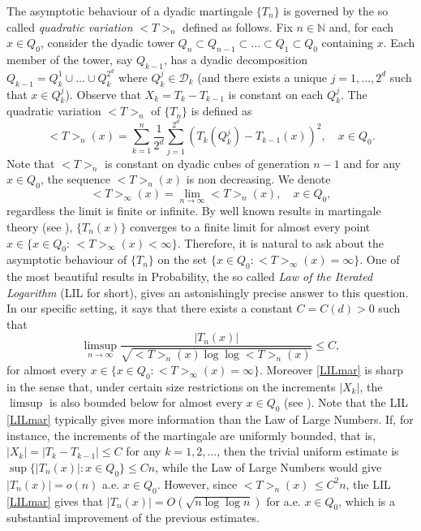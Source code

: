 \documentclass[11pt,letterpaper]{amsart}
\theoremstyle{definition}
\numberwithin{equation}{section}
\newcommand{\N}{\mathbb N}
\begin{document}
The asymptotic behaviour of a dyadic martingale $\{ T_n \}$ is governed by the so called \textit{quadratic variation} $<T>_n$ defined as follows. Fix $n\in \N$ and, for each $x\in Q_0$, consider the dyadic tower $Q_n \subset Q_{n-1} \subset ... \subset Q_1 \subset Q_0$ containing $x$. Each member of the tower, say $Q_{k-1}$, has a dyadic decomposition $Q_{k-1} = Q_k^1 \cup ...\cup Q_k^{2^d}$ where $Q_k^j \in \mathcal{D}_k$ (and there exists a unique $j=1, \ldots, 2^d$ such that $x \in Q_k^j$). Observe that $X_k = T_k - T_{k-1}$ is constant on each $Q_k^j$. The quadratic variation $<T>_n$ of  $\{ T_n \}$ is defined as 
\begin{equation*}\label{quadr}
<T>_n (x) =  \sum_{k=1}^n \frac{1}{2^d} \sum_{j=1}^{2^d} (T_{k}(Q_k^j) - T_{k-1}(x))^2 , \quad x \in Q_0 . 
\end{equation*}
Note that $<T>_n$ is constant on dyadic cubes of generation $n-1$ and for any $x \in Q_0$, the sequence $<T>_n (x)$ is non decreasing. We denote 
$$
<T>_{\infty} (x) = \lim_{n \to \infty} <T>_n (x), \quad x \in Q_0 ,
$$
regardless the limit is finite or infinite.  By well known results in martingale theory (see \cite{S}), $\{ T_n (x) \}$ converges to a finite limit for almost every point $x \in \{x \in Q_0 : \,  <T>_{\infty} (x) < \infty  \}$. Therefore, it is natural to ask  about the asymptotic behaviour of $\{ T_n \}$ on the set $\{ x \in Q_0 : <T>_{\infty} (x) = \infty  \}$. One of the most beautiful results in Probability, the so called \textit{Law of the Iterated Logarithm} (LIL for short), gives an astonishingly precise answer to this question. In our specific setting, it says that there exists a constant $C=C(d)>0$ such that
\begin{equation}\label{LILmar}
\limsup_{n\to \infty} \frac{|T_n (x)|}{ \sqrt{<T>_{n}(x) \log \log <T>_{n}(x)}} \leq C , 
\end{equation}
for almost every $x \in \{ x \in Q_0 :  <T>_{\infty} (x)  = \infty \}$. Moreover \eqref{LILmar} is sharp in the sense that, under certain size restrictions on the increments $|X_k|$, the $\limsup$  is also bounded below for almost every $x \in Q_0$ (see \cite{BM, St}). Note that the LIL \eqref{LILmar} typically gives more information than the Law of Large Numbers. If, for instance, the increments of the martingale are uniformly bounded, that is, $|X_k | = |T_k - T_{k-1}| \leq C $ for any $k=1,2,\ldots$, then the trivial uniform estimate is $\sup \{|T_n (x)|: x \in Q_0 \} \leq C n $, while the Law of Large Numbers would give $|T_n (x)| = o(n)$ a.e. $x \in Q_0$. However, since $<T>_n (x) \, \leq C^2 n $, the LIL \eqref{LILmar} gives that $|T_n (x)| = O( \sqrt{n \log \log n })$ for a.e. $x \in Q_0$, which is a substantial improvement of the previous estimates.
\end{document}
